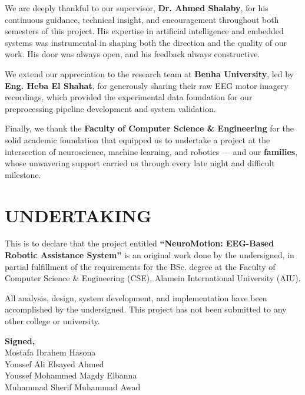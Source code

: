 \documentclass[12pt, a4paper, oneside]{report}
\begin{document}
We are deeply thankful to our supervisor, \textbf{Dr. Ahmed Shalaby}, for his continuous guidance, technical insight, and encouragement throughout both semesters of this project. His expertise in artificial intelligence and embedded systems was instrumental in shaping both the direction and the quality of our work. His door was always open, and his feedback always constructive.

We extend our appreciation to the research team at \textbf{Benha University}, led by \textbf{Eng. Heba El Shahat}, for generously sharing their raw EEG motor imagery recordings, which provided the experimental data foundation for our preprocessing pipeline development and system validation.

Finally, we thank the \textbf{Faculty of Computer Science \& Engineering} for the solid academic foundation that equipped us to undertake a project at the intersection of neuroscience, machine learning, and robotics --- and our \textbf{families}, whose unwavering support carried us through every late night and difficult milestone.

\clearpage
\chapter*{UNDERTAKING}

This is to declare that the project entitled \textbf{``NeuroMotion: EEG-Based Robotic Assistance System''} is an original work done by the undersigned, in partial fulfillment of the requirements for the BSc. degree at the Faculty of Computer Science \& Engineering (CSE), Alamein International University (AIU).

All analysis, design, system development, and implementation have been accomplished by the undersigned. This project has not been submitted to any other college or university.

\vspace{2cm}

\noindent
\textbf{Signed,}\\[1cm]
Mostafa Ibrahem Hasona\\[0.7cm]
Youssef Ali Elsayed Ahmed\\[0.7cm]
Youssef Mohammed Magdy Elbanna\\[0.7cm]
Muhammad Sherif Muhammad Awad

\clearpage
\end{document}
